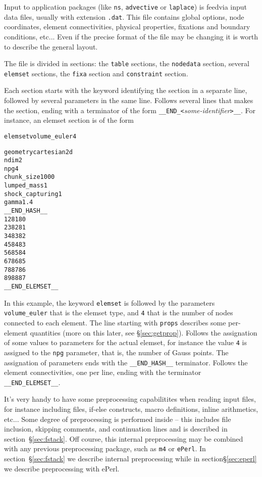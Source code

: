 
%
Input to application packages (like \verb+ns+, \verb+advective+ or
\verb+laplace+) is feedvia input data files, usually with extension
\verb+.dat+. This file contains global options, node coordinates,
element connectivities, physical properties, fixations and boundary
conditions, etc... Even if the precise format of the file may be
changing it is worth to describe the general layout. 

The file is divided in sections: the 
\verb+table+ sections, the \verb+nodedata+ section, several
\verb+elemset+ sections, the \verb+fixa+ section and \verb+constraint+
section. 

Each section starts with the keyword identifying the section in a
separate line, followed by several parameters in the same
line. Follows several lines that makes the section, ending with a
terminator of the form
\verb+__END_<+\emph{some-identifier}\verb+>__+. For instance, an
elemset section is of the form

\begin{alltt}
elemset volume_euler 4

geometry cartesian2d
ndim 2
npg 4
chunk_size 1000
lumped_mass 1
shock_capturing 1
gamma 1.4
__END_HASH__
    1    2   81   80
    2    3   82   81
    3    4   83   82
    4    5   84   83
    5    6   85   84
    6    7   86   85
    7    8   87   86
    8    9   88   87
__END_ELEMSET__
\end{alltt}

In this example, the keyword \verb+elemset+ is followed by the
parameters \verb+volume_euler+ that is the elemset type, and
\verb+4+ that is the number of nodes connected to each element. The
line starting with \verb+props+ 
describes some per-element quantities (more on this later, see
\S\ref{sec:getprop}). Follows the assignation of some values to
parameters for the actual elemset, for instance the value \verb+4+ is
assigned to the \verb+npg+ parameter, that is, the number of Gauss
points. The assignation of parameters ends with the \verb+__END_HASH__+
terminator. Follows the element connectivities, one per line, ending
with the terminator \verb+__END_ELEMSET__+. 



%
It's very handy to have some preprocessing capabilitites when reading
input files, for instance including files, if-else constructs, macro
definitions, inline arithmetics, etc... Some degree of preprocessing
is performed inside \pfem{} -- this includes file inclusion, skipping
comments, and continuation lines and is described in
section~\S\ref{sec:fstack}. Off course, this internal preprocessing
may be combined with any previous preprocessing package, such as
\verb+m4+ or \verb+ePerl+. In section~\S\ref{sec:fstack} we describe
internal preprocessing while in section\S\ref{sec:eperl} we describe 
preprocessing with ePerl. 

